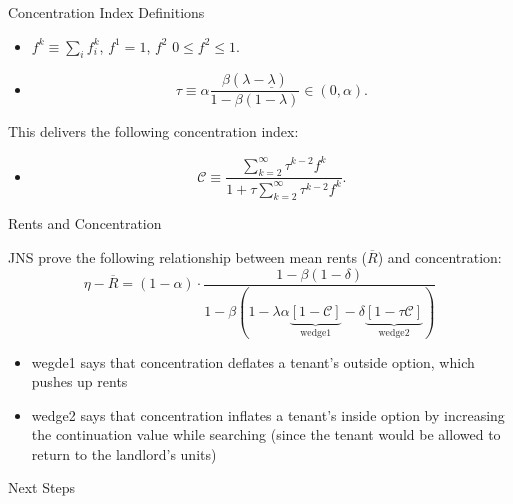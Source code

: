 \documentclass[10pt, xcolor=dvipsnames]{beamer}
\begin{document}
\begin{frame}{Concentration Index}
Definitions
    \begin{itemize}
    \item $f^k \equiv \sum_i f_i^k$, $f^1 = 1$, $f^2$  $0 \leq f^2 \leq 1$.
\item  \begin{equation}
            \tau \equiv \alpha \frac{\beta(\lambda - \underline{\lambda})}{1 - \beta(1 - \lambda)} \in (0, \alpha).
        \end{equation}
\end{itemize}
This delivers the following concentration index:
\begin{itemize}
        \item
            \begin{equation}
                \mathcal{C} \equiv \frac{\sum_{k=2}^{\infty} \tau^{k-2} f^k}{1 + \tau \sum_{k=2}^{\infty} \tau^{k-2} f^k}.
            \end{equation}
\end{itemize}

\end{frame}

\begin{frame}{Rents and Concentration}

JNS prove the following relationship between mean rents ($\overline{R}$) and concentration:\\

\begin{equation}\label{eq:concentration-rents}
    \eta - \overline{R} = (1 - \alpha) \cdot \frac{1 - \beta(1 - \delta)}{1 - \beta \left( 1 - \lambda \alpha \underbrace{[1 - \mathcal{C}]}_{\text{wedge1}} - \delta \underbrace{[1 - \tau \mathcal{C}]}_{\text{wedge2}} \right)}
\end{equation}
\begin{itemize}
    \item wegde1 says that concentration deflates a tenant's outside option, which pushes up rents
    \item wedge2 says that concentration inflates a tenant's inside option by increasing the continuation value while searching (since the tenant would be allowed to return to the landlord's units)
\end{itemize}

\end{frame}

\begin{frame}{Next Steps}
    
\end{frame}
\end{document}
